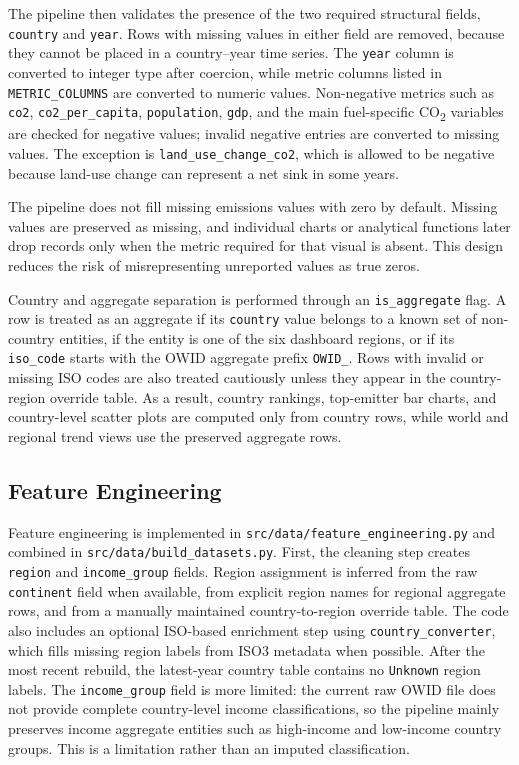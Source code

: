 \documentclass[a4paper,12pt]{article}
\begin{document}
The pipeline then validates the presence of the two required structural fields,
\texttt{country} and \texttt{year}. Rows with missing values in either field are removed,
because they cannot be placed in a country--year time series. The \texttt{year} column is
converted to integer type after coercion, while metric columns listed in
\texttt{METRIC\_COLUMNS} are converted to numeric values. Non-negative metrics such as
\texttt{co2}, \texttt{co2\_per\_capita}, \texttt{population}, \texttt{gdp}, and the main
fuel-specific CO\textsubscript{2} variables are checked for negative values; invalid
negative entries are converted to missing values. The exception is
\texttt{land\_use\_change\_co2}, which is allowed to be negative because land-use change
can represent a net sink in some years.

The pipeline does not fill missing emissions values with zero by default. Missing values
are preserved as missing, and individual charts or analytical functions later drop records
only when the metric required for that visual is absent. This design reduces the risk of
misrepresenting unreported values as true zeros.

Country and aggregate separation is performed through an \texttt{is\_aggregate} flag. A
row is treated as an aggregate if its \texttt{country} value belongs to a known set of
non-country entities, if the entity is one of the six dashboard regions, or if its
\texttt{iso\_code} starts with the OWID aggregate prefix \texttt{OWID\_}. Rows with
invalid or missing ISO codes are also treated cautiously unless they appear in the
country-region override table. As a result, country rankings, top-emitter bar charts, and
country-level scatter plots are computed only from country rows, while world and regional
trend views use the preserved aggregate rows.

\subsection{Feature Engineering}

Feature engineering is implemented in \texttt{src/data/feature\_engineering.py} and
combined in \texttt{src/data/build\_datasets.py}. First, the cleaning step creates
\texttt{region} and \texttt{income\_group} fields. Region assignment is inferred from the
raw \texttt{continent} field when available, from explicit region names for regional
aggregate rows, and from a manually maintained country-to-region override table. The code
also includes an optional ISO-based enrichment step using \texttt{country\_converter},
which fills missing region labels from ISO3 metadata when possible. After the most recent
rebuild, the latest-year country table contains no \texttt{Unknown} region labels. The
\texttt{income\_group} field is more limited: the current raw OWID file does not provide
complete country-level income classifications, so the pipeline mainly preserves income
aggregate entities such as high-income and low-income country groups. This is a limitation
rather than an imputed classification.
\end{document}
